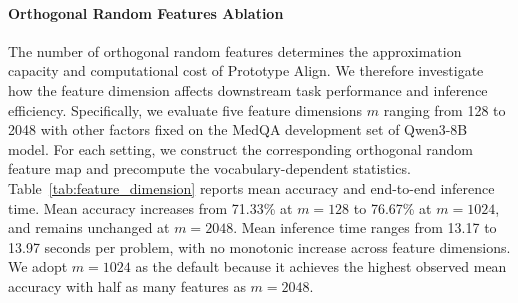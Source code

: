 \documentclass[11pt]{article}
\begin{document}
\paragraph{Orthogonal Random Features Ablation}
The number of orthogonal random features determines the approximation capacity and computational cost of Prototype Align. We therefore investigate how the feature dimension affects downstream task performance and inference efficiency. Specifically, we evaluate five feature dimensions $m$ ranging from 128 to 2048 with other factors fixed on the MedQA development set of Qwen3-8B model. For each setting, we construct the corresponding orthogonal random feature map and precompute the vocabulary-dependent statistics. 
Table~\ref{tab:feature_dimension} reports mean accuracy and end-to-end inference time. Mean accuracy increases from 71.33\% at $m=128$ to 76.67\% at $m=1024$, and remains unchanged at $m=2048$. Mean inference time ranges from 13.17 to 13.97 seconds per problem, with no monotonic increase across feature dimensions. We adopt $m=1024$ as the default because it achieves the highest observed mean accuracy with half as many features as $m=2048$.


\providecommand{\smallerr}[1]{}
\renewcommand{\smallerr}[1]{{\scriptsize$\pm#1$}}


\end{document}
